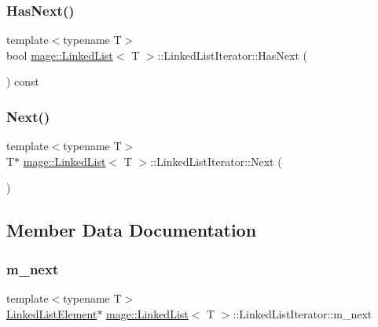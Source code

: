 \subsubsection{\texorpdfstring{Has\+Next()}{HasNext()}}
{\footnotesize\ttfamily template$<$typename T$>$ \\
bool \hyperlink{classmage_1_1_linked_list}{mage\+::\+Linked\+List}$<$ T $>$\+::Linked\+List\+Iterator\+::\+Has\+Next (\begin{DoxyParamCaption}{ }\end{DoxyParamCaption}) const}

\hypertarget{structmage_1_1_linked_list_1_1_linked_list_iterator_aaffb4ff395841103f65d09b2784ad61f}{}\label{structmage_1_1_linked_list_1_1_linked_list_iterator_aaffb4ff395841103f65d09b2784ad61f} 
\subsubsection{\texorpdfstring{Next()}{Next()}}
{\footnotesize\ttfamily template$<$typename T$>$ \\
T$\ast$ \hyperlink{classmage_1_1_linked_list}{mage\+::\+Linked\+List}$<$ T $>$\+::Linked\+List\+Iterator\+::\+Next (\begin{DoxyParamCaption}{ }\end{DoxyParamCaption})}



\subsection{Member Data Documentation}
\hypertarget{structmage_1_1_linked_list_1_1_linked_list_iterator_a2936c8e80e5ef746150a8a93ef1300cb}{}\label{structmage_1_1_linked_list_1_1_linked_list_iterator_a2936c8e80e5ef746150a8a93ef1300cb} 
\subsubsection{\texorpdfstring{m\+\_\+next}{m\_next}}
{\footnotesize\ttfamily template$<$typename T$>$ \\
\hyperlink{structmage_1_1_linked_list_1_1_linked_list_element}{Linked\+List\+Element}$\ast$ \hyperlink{classmage_1_1_linked_list}{mage\+::\+Linked\+List}$<$ T $>$\+::Linked\+List\+Iterator\+::m\+\_\+next\hspace{0.3cm}{\ttfamily [private]}}

